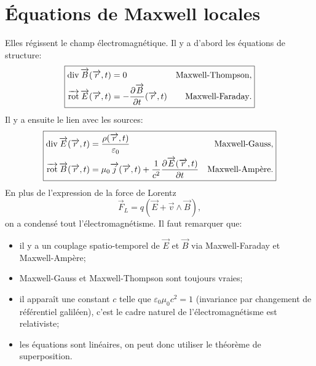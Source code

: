 \section{Équations de Maxwell locales}

Elles régissent le champ électromagnétique. Il y a d'abord les équations de structure:
\begin{equation}
    \boxed{
        \begin{aligned}
            \operatorname{div}\protect\overrightarrow{{B}}(\protect\overrightarrow{{r}},t)&=0&\text{Maxwell-Thompson},\\
            \operatorname{\overrightarrow{\text{rot}}}\protect\overrightarrow{{E}}(\protect\overrightarrow{{r}},t)&=-\frac{\partial\protect\overrightarrow{{B}}}{\partial t}(\protect\overrightarrow{{r}},t)&\text{Maxwell-Faraday}.
        \end{aligned}
    }
\end{equation}
Il y a ensuite le lien avec les sources:
\begin{equation}
    \boxed{
        \begin{aligned}
            \operatorname{div}\protect\overrightarrow{{E}}(\protect\overrightarrow{{r}},t)&=\frac{\rho(\protect\overrightarrow{{r}},t)}{\varepsilon_0}&\text{Maxwell-Gauss},\\
            \operatorname{\overrightarrow{\text{rot}}}\protect\overrightarrow{{B}}(\protect\overrightarrow{{r}},t)&=\mu_0\protect\overrightarrow{{j}}(\protect\overrightarrow{{r}},t)+\frac{1}{c^{2}}\frac{\partial\protect\overrightarrow{{E}}(\protect\overrightarrow{{r}},t)}{\partial t}&\text{Maxwell-Ampère}.
        \end{aligned}
    }
\end{equation}
En plus de l'expression de la force de Lorentz
\begin{equation}
    \boxed{
        \vec{F}_L=q(\vec{E}+\vec{v}\wedge\vec{B}),
    }
\end{equation}
on a condensé tout l'électromagnétisme. Il faut remarquer que:
\begin{itemize}
    \item il y a un couplage spatio-temporel de $\vec{E}$ et $\vec{B}$ via Maxwell-Faraday et Maxwell-Ampère;
    \item Maxwell-Gauss et Maxwell-Thompson sont toujours vraies;
    \item il apparaît une constant $c$ telle que $\varepsilon_0\mu_0 c^{2}=1$ (invariance par changement de référentiel galiléen), c'est le cadre naturel de l'électromagnétisme est relativiste;
    \item les équations sont linéaires, on peut donc utiliser le théorème de superposition.
\end{itemize}